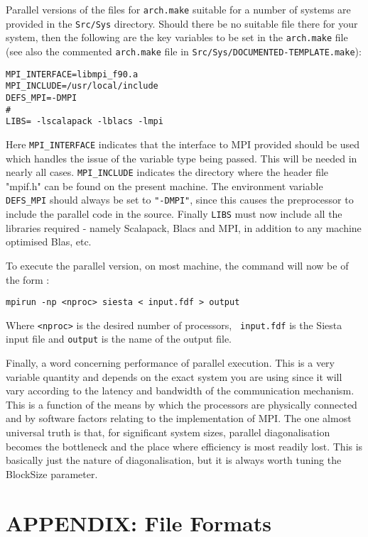 \documentclass[11pt]{article}
\begin{document}
\noindent
Parallel versions of the files for {\tt arch.make} suitable for a
number of systems are provided in the {\tt Src/Sys} directory. Should
there be no suitable file there for your system, then the following
are the key variables to be set in the {\tt arch.make} file (see also
the commented {\tt arch.make} file in {\tt Src/Sys/DOCUMENTED-TEMPLATE.make}):

\begin{verbatim}
MPI_INTERFACE=libmpi_f90.a
MPI_INCLUDE=/usr/local/include
DEFS_MPI=-DMPI
#
LIBS= -lscalapack -lblacs -lmpi
\end{verbatim}

Here {\tt MPI\_INTERFACE} indicates that the interface to MPI provided
should be used which handles the issue of the variable type being
passed. This will be needed in nearly all cases. {\tt MPI\_INCLUDE}
indicates the directory where the header file "mpif.h" can be found on
the present machine. The environment variable {\tt DEFS\_MPI} should always
be set to {\tt "-DMPI"}, since this causes the preprocessor to include the
parallel code in the source. Finally {\tt LIBS} must now include all the
libraries required - namely Scalapack, Blacs and MPI, in addition to
any machine optimised Blas, etc.

To execute the parallel version, on most machine, the command will now
be of the form :

{\tt mpirun -np <nproc> siesta < input.fdf > output}

Where {\tt <nproc>} is the desired number of processors, {\tt
input.fdf} is the {\sc Siesta} input file and {\tt output} is the name
of the output file.

Finally, a word concerning performance of parallel execution. This is
a very variable quantity and depends on the exact system you are using
since it will vary according to the latency and bandwidth of the
communication mechanism.  This is a function of the means by which the
processors are physically connected and by software factors relating
to the implementation of MPI. The one almost universal truth is that,
for significant system sizes, parallel diagonalisation becomes
the bottleneck and the place where efficiency is most readily
lost. This is basically just the nature of diagonalisation, but it is
always worth tuning the BlockSize parameter.

\newpage
\section{APPENDIX: File Formats}
\end{document}
